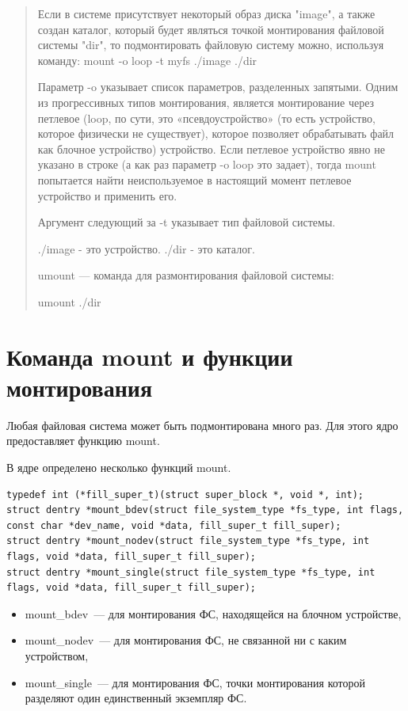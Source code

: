\begin{quote}
Если в системе присутствует некоторый образ диска "image", а также создан каталог, который будет являться точкой монтирования файловой системы "dir", то подмонтировать файловую систему можно, используя команду: mount -o loop -t myfs ./image ./dir

Параметр -o указывает список параметров, разделенных запятыми. Одним из прогрессивных типов монтирования, является монтирование через петлевое (loop, по сути, это «псевдоустройство» (то есть устройство, которое физически не существует), которое позволяет обрабатывать файл как блочное устройство) устройство. Если петлевое устройство явно не указано в строке (а как раз параметр -o loop это задает), тогда mount попытается найти неиспользуемое в настоящий момент петлевое устройство и применить его.

Аргумент следующий за -t указывает тип файловой системы.

./image - это устройство. ./dir - это каталог.

umount — команда для размонтирования файловой системы:

umount ./dir
\end{quote}

\section{Команда mount и функции монтирования}

Любая файловая система может быть подмонтирована много раз. Для этого ядро предоставляет функцию mount.

В ядре определено несколько функций mount.
\begin{lstlisting}
typedef int (*fill_super_t)(struct super_block *, void *, int);
struct dentry *mount_bdev(struct file_system_type *fs_type, int flags, const char *dev_name, void *data, fill_super_t fill_super);
struct dentry *mount_nodev(struct file_system_type *fs_type, int flags, void *data, fill_super_t fill_super);
struct dentry *mount_single(struct file_system_type *fs_type, int flags, void *data, fill_super_t fill_super);
\end{lstlisting}

\begin{itemize}
    \item mount\_bdev — для монтирования ФС, находящейся на блочном устройстве,
    \item mount\_nodev — для монтирования ФС, не связанной ни с каким устройством,
    \item mount\_single — для монтирования ФС, точки монтирования которой разделяют один единственный экземпляр ФС.
\end{itemize}

